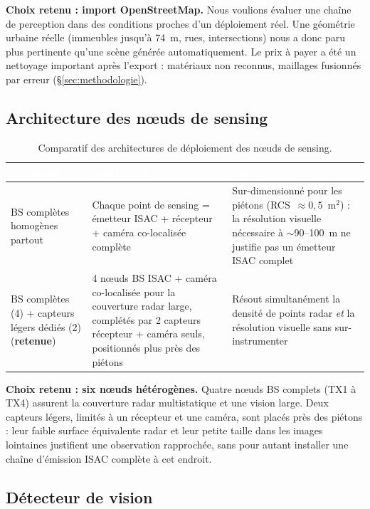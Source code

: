 \documentclass[12pt,a4paper,titlepage]{article}
\newcommand{\hd}[1]{\textcolor{white}{\textbf{#1}}}
\newcommand{\choix}{\rowcolor{tabchoice}}
\begin{document}
\textbf{Choix retenu : import OpenStreetMap.} Nous voulions évaluer une chaîne de perception dans des conditions proches d'un déploiement réel. Une géométrie urbaine réelle (immeubles jusqu'à 74~m, rues, intersections) nous a donc paru plus pertinente qu'une scène générée automatiquement. Le prix à payer a été un nettoyage important après l'export : matériaux non reconnus, maillages fusionnés par erreur (\S\ref{sec:methodologie}).

\subsection{Architecture des n\oe uds de sensing}
\label{subsec:choix_architecture_noeuds}

\begin{table}[H]
    \centering
    \caption{Comparatif des architectures de déploiement des n\oe uds de sensing.}
    \begin{tabularx}{\textwidth}{F{4cm}LL}
        \toprule
        \hd{Approche} & \hd{Description} & \hd{Verdict} \\
        \midrule
        BS complètes homogènes partout & Chaque point de sensing = émetteur ISAC + récepteur + caméra co-localisée complète & Sur-dimensionné pour les piétons (RCS~$\approx 0{,}5$~m$^2$) : la résolution visuelle nécessaire à $\sim$90--100~m ne justifie pas un émetteur ISAC complet \\
        \choix BS complètes (4) + capteurs légers dédiés (2) (\textbf{retenue}) & 4 n\oe uds BS ISAC + caméra co-localisée pour la couverture radar large, complétés par 2 capteurs récepteur + caméra seuls, positionnés plus près des piétons & Résout simultanément la densité de points radar \textit{et} la résolution visuelle sans sur-instrumenter \\
        \bottomrule
    \end{tabularx}
\end{table}

\textbf{Choix retenu : six n\oe uds hétérogènes.} Quatre n\oe uds BS complets (TX1 à TX4) assurent la couverture radar multistatique et une vision large. Deux capteurs légers, limités à un récepteur et une caméra, sont placés près des piétons : leur faible surface équivalente radar et leur petite taille dans les images lointaines justifient une observation rapprochée, sans pour autant installer une chaîne d'émission ISAC complète à cet endroit.

\subsection{Détecteur de vision}
\end{document}
